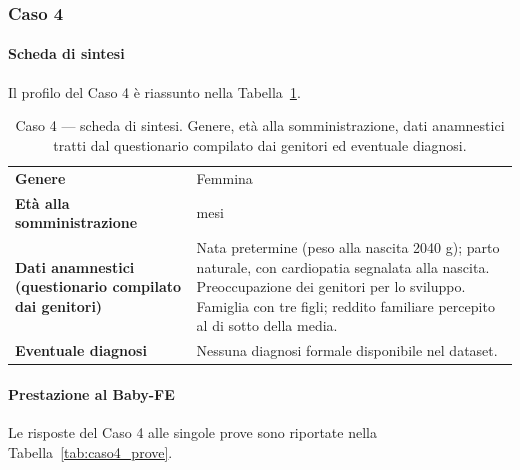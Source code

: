  \subsubsection*{Caso 4}

 \paragraph*{Scheda di sintesi}

Il profilo del Caso 4 è riassunto nella Tabella~\ref{tab:caso4_scheda}.

\begin{table}[htbp]
\centering
\caption[Caso 4 --- scheda di sintesi]{Caso 4 --- scheda di sintesi. Genere, età alla somministrazione, dati anamnestici tratti dal questionario compilato dai genitori ed eventuale diagnosi.}
\label{tab:caso4_scheda}
\begin{tabular}{|>{\raggedright\arraybackslash}p{4.3cm}|>{\raggedright\arraybackslash}p{9.2cm}|}
\toprule
\textbf{Genere} & Femmina \\
\textbf{Età alla somministrazione} & 37 mesi \\
\textbf{Dati anamnestici (questionario compilato dai genitori)} & Nata pretermine (peso alla nascita 2040 g); parto naturale, con cardiopatia segnalata alla nascita. Preoccupazione dei genitori per lo sviluppo. Famiglia con tre figli; reddito familiare percepito al di sotto della media. \\
\textbf{Eventuale diagnosi} & Nessuna diagnosi formale disponibile nel dataset. \\
\bottomrule
\end{tabular}
\end{table}

 \paragraph*{Prestazione al Baby-FE}

Le risposte del Caso 4 alle singole prove sono riportate nella Tabella~\ref{tab:caso4_prove}.


